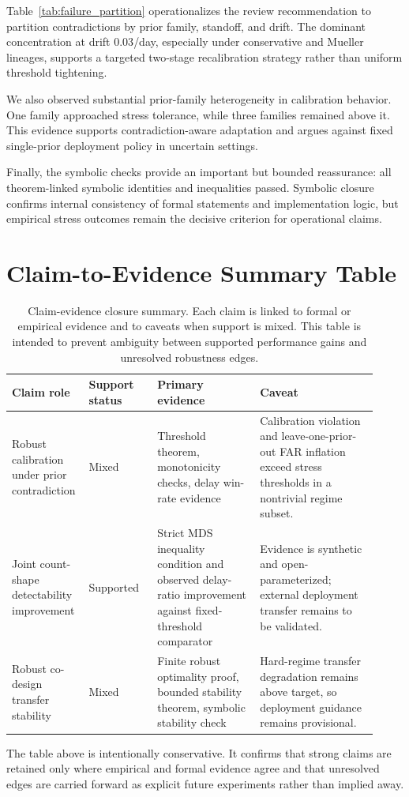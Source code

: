 \documentclass{article} %
\begin{document}
Table~\ref{tab:failure_partition} operationalizes the review recommendation to partition contradictions by prior family, standoff, and drift. The dominant concentration at drift $0.03$/day, especially under conservative and Mueller lineages, supports a targeted two-stage recalibration strategy rather than uniform threshold tightening.

We also observed substantial prior-family heterogeneity in calibration behavior. One family approached stress tolerance, while three families remained above it. This evidence supports contradiction-aware adaptation and argues against fixed single-prior deployment policy in uncertain settings.

Finally, the symbolic checks provide an important but bounded reassurance: all theorem-linked symbolic identities and inequalities passed. Symbolic closure confirms internal consistency of formal statements and implementation logic, but empirical stress outcomes remain the decisive criterion for operational claims.

\section{Claim-to-Evidence Summary Table}\label{sec:appendix_claims}
\begin{table}[h]
\caption{Claim-evidence closure summary. Each claim is linked to formal or empirical evidence and to caveats when support is mixed. This table is intended to prevent ambiguity between supported performance gains and unresolved robustness edges.}
\label{tab:claim_evidence_appendix}
\centering
\footnotesize
\renewcommand{\arraystretch}{1.1}
\setlength{\tabcolsep}{4pt}
\begin{tabular}{p{0.16\linewidth}p{0.18\linewidth}p{0.27\linewidth}p{0.31\linewidth}}
\hline
Claim role & Support status & Primary evidence & Caveat \\
\hline
Robust calibration under prior contradiction & Mixed & Threshold theorem, monotonicity checks, delay win-rate evidence & Calibration violation and leave-one-prior-out FAR inflation exceed stress thresholds in a nontrivial regime subset. \\
Joint count-shape detectability improvement & Supported & Strict MDS inequality condition and observed delay-ratio improvement against fixed-threshold comparator & Evidence is synthetic and open-parameterized; external deployment transfer remains to be validated. \\
Robust co-design transfer stability & Mixed & Finite robust optimality proof, bounded stability theorem, symbolic stability check & Hard-regime transfer degradation remains above target, so deployment guidance remains provisional. \\
\hline
\end{tabular}
\end{table}

The table above is intentionally conservative. It confirms that strong claims are retained only where empirical and formal evidence agree and that unresolved edges are carried forward as explicit future experiments rather than implied away.
\end{document}
